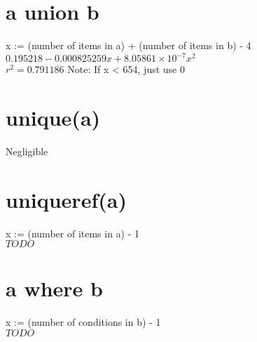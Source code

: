\documentclass[12pt]{article}
\begin{document}
	\section{a union b}
	x := (number of items in a) + (number of items in b) - 4\\
	$0.195218 - 0.000825259 x + 8.05861 \times 10^{-7} x^2$\\
	$r^2 = 0.791186$
	Note: If x < 654, just use 0
	
	\section{unique(a)}
	Negligible
	
	\section{uniqueref(a)}
	x := (number of items in a) - 1\\
	$TODO$
	
	\section{a where b}
	x := (number of conditions in b) - 1\\
	$TODO$
\end{document}
